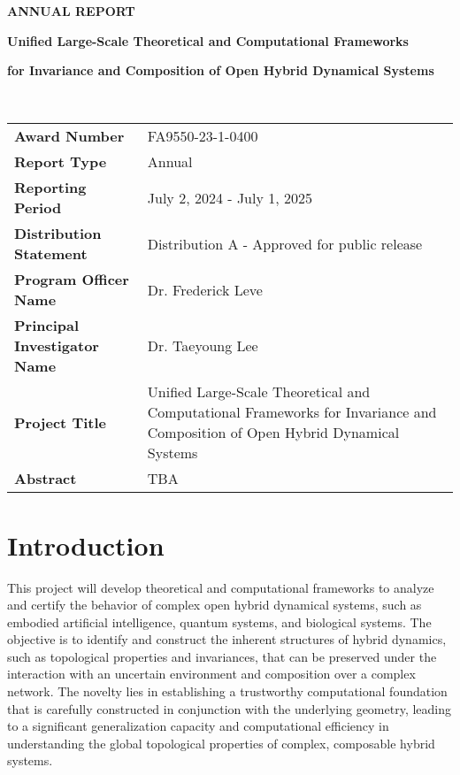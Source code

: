 \documentclass[letterpaper,11pt]{article}
\begin{document}
\thispagestyle{empty}
\noindent\textbf{ANNUAL REPORT}\\[1cm]
\centerline{\textbf{\Large Unified Large-Scale Theoretical and Computational Frameworks}}
\centerline{\textbf{\Large for Invariance and Composition of Open Hybrid Dynamical Systems}}\\[1cm]

\renewcommand\arraystretch{1.5}
\begin{tabularx}{1.0\textwidth}{>{\bfseries}lX}
Award Number & FA9550-23-1-0400\\
Report Type & Annual\\
Reporting Period & July 2, 2024 - July 1, 2025\\
Distribution Statement & Distribution A - Approved for public release\\
Program Officer Name & Dr. Frederick Leve\\
Principal Investigator Name & Dr. Taeyoung Lee\\
Project Title & Unified Large-Scale Theoretical and Computational Frameworks for Invariance and Composition of Open Hybrid Dynamical Systems\\
%
Abstract & TBA
\end{tabularx}

\clearpage\newpage

\tableofcontents

\clearpage\newpage
\setcounter{page}{1}
\section{Introduction}
This project will develop theoretical and computational frameworks to analyze and certify the behavior of complex open hybrid dynamical systems, such as embodied artificial intelligence,  quantum systems, and biological systems. 
The objective is to identify and construct the inherent structures of hybrid dynamics, such as topological properties and invariances, that can be preserved under the interaction with an uncertain environment and composition over a complex network.
The novelty lies in establishing a trustworthy computational foundation that is carefully constructed in conjunction with the underlying geometry, leading to a significant generalization capacity and computational efficiency in understanding the global topological properties of complex, composable hybrid systems. 
\end{document}
